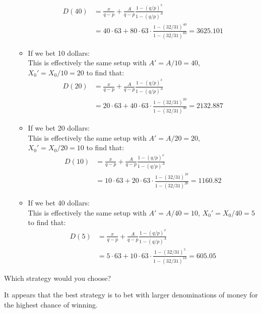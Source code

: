 \documentclass[12pt,twoside, letter]{exam}
\theoremstyle{definition}
\begin{document}
\begin{itemize}
\begin{solution}
\begin{itemize}
            \begin{align*}
              D(40) &= \frac{x}{q-p} + \frac{A}{q-p}\frac{1-(q/p)^x}{1-(q/p)^A} \\
              &= 40\cdot 63 + 80\cdot 63 \cdot \frac{1-(32/31)^{40}}{1-(32/31)^{80}} = 3625.101
            \end{align*}
            \item If we bet 10 dollars: \\
              This is effectively the same setup with $A' = A/10 = 40$,
              $X_0'= X_0/10 = 20$ to find that:
              \begin{align*}
                D(20) &= \frac{x}{q-p} + \frac{A}{q-p}\frac{1-(q/p)^x}{1-(q/p)^A} \\
                &= 20\cdot 63 + 40\cdot 63 \cdot \frac{1-(32/31)^{20}}{1-(32/31)^{40}} = 2132.887
              \end{align*}
            \item If we bet 20 dollars: \\
              This is effectively the same setup with $A' = A/20 = 20$,
              $X_0'= X_0/20 = 10$ to find that:
              \begin{align*}
                D(10) &= \frac{x}{q-p} + \frac{A}{q-p}\frac{1-(q/p)^x}{1-(q/p)^A} \\
                &= 10\cdot 63 + 20\cdot 63 \cdot \frac{1-(32/31)^{10}}{1-(32/31)^{20}} = 1160.82
              \end{align*}
            \item If we bet 40 dollars: \\
              This is effectively the same setup with $A' = A/40 = 10$,
              $X_0'= X_0/40 = 5$ to find that:
              \begin{align*}
                D(5) &= \frac{x}{q-p} + \frac{A}{q-p}\frac{1-(q/p)^x}{1-(q/p)^A} \\
                &= 5\cdot 63 + 10\cdot 63 \cdot \frac{1-(32/31)^{5}}{1-(32/31)^{10}} = 605.05
              \end{align*}
        \end{itemize}
    \end{solution}
\end{itemize}
Which strategy would you choose?
  \begin{solution}
    It appears that the best strategy is to bet with larger denominations of money for the highest chance of winning.
  \end{solution}
\end{document}

